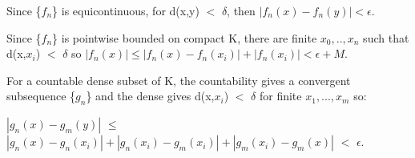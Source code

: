     \begin{intuition}
        Since \{$f_n$\} is equicontinuous, for d(x,y) $<$ $\delta$, then
        $|f_n(x) - f_n(y)| < \epsilon$.

        Since \{$f_n$\} is pointwise bounded on compact K, there are finite
        $x_0,..,x_n$ such that d(x,$x_i$) $<$ $\delta$
        so $|f_n(x)| \leq |f_n(x) - f_n(x_i)| + |f_n(x_i)| < \epsilon + M$.

        For a countable dense subset of K, the countability gives a
        convergent subsequence \{$g_n$\} and the dense gives
        d(x,$x_i$) $<$ $\delta$ for finite $x_1,...,x_m$ so:
        
        \hspace{0.5cm}
        $|g_n(x) - g_m(y)|$
        $\leq$ $|g_n(x) - g_n(x_i)| + |g_n(x_i) - g_m(x_i)| + |g_m(x_i) - g_m(x)|$
        $<$ $\epsilon$.
    \end{intuition}

    \vspace{0.1cm}

